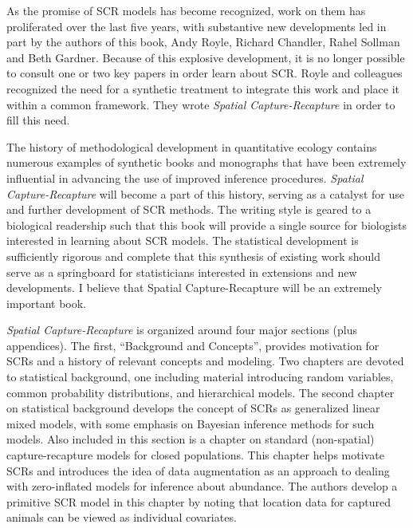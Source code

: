 As the promise of SCR models has become recognized, work on them has
proliferated over the last five years, with substantive new
developments led in part by the authors of this book, Andy Royle,
Richard Chandler, Rahel Sollman and Beth Gardner. Because of this
explosive development, it is no longer possible to consult one or two
key papers in order learn about SCR. Royle and colleagues recognized
the need for a synthetic treatment to integrate this work and place it
within a common framework. They wrote {\it Spatial Capture-Recapture}
in order to fill this need.

The history of methodological development in quantitative ecology
contains numerous examples of synthetic books and monographs that have
been extremely influential in advancing the use of improved inference
procedures. {\it Spatial Capture-Recapture} will become a part of this
history, serving as a catalyst for use and further development of SCR
methods. The writing style is geared to a biological readership such
that this book will provide a single source for biologists interested
in learning about SCR models. The statistical development is
sufficiently rigorous and complete that this synthesis of existing
work should serve as a springboard for statisticians interested in
extensions and new developments. I believe that Spatial
Capture-Recapture will be an extremely important book.

{\it Spatial Capture-Recapture} is organized around four major
sections (plus appendices). The first, ``Background and Concepts'',
provides motivation for SCRs and a history of relevant concepts and
modeling. Two chapters are devoted to statistical background, one
including material introducing random variables, common probability
distributions, and hierarchical models. The second chapter on
statistical background develops the concept of SCRs as generalized
linear mixed models, with some emphasis on Bayesian inference methods
for such models. Also included in this section is a chapter on
standard (non-spatial) capture-recapture models for closed
populations. This chapter helps motivate SCRs and introduces the idea
of data augmentation as an approach to dealing with zero-inflated
models for inference about abundance. The authors develop a primitive
SCR model in this chapter by noting that location data for captured
animals can be viewed as individual covariates.


